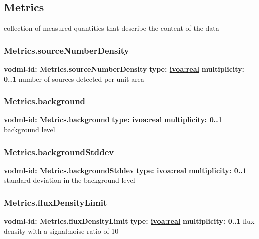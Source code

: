   \subsection{Metrics}
  \label{sect:Metrics}
    collection of measured quantities that describe the content of the data

    \subsubsection{Metrics.sourceNumberDensity}
      \textbf{vodml-id: Metrics.sourceNumberDensity} \newline
      \textbf{type: \hyperref[sect:ivoa]{ivoa:real}} \newline
      \textbf{multiplicity: 0..1} \newline
      number of sources detected per unit area

    \subsubsection{Metrics.background}
      \textbf{vodml-id: Metrics.background} \newline
      \textbf{type: \hyperref[sect:ivoa]{ivoa:real}} \newline
      \textbf{multiplicity: 0..1} \newline
      background level

    \subsubsection{Metrics.backgroundStddev}
      \textbf{vodml-id: Metrics.backgroundStddev} \newline
      \textbf{type: \hyperref[sect:ivoa]{ivoa:real}} \newline
      \textbf{multiplicity: 0..1} \newline
      standard deviation in the background level

    \subsubsection{Metrics.fluxDensityLimit}
      \textbf{vodml-id: Metrics.fluxDensityLimit} \newline
      \textbf{type: \hyperref[sect:ivoa]{ivoa:real}} \newline
      \textbf{multiplicity: 0..1} \newline
      flux density with a signal:noise ratio of 10

